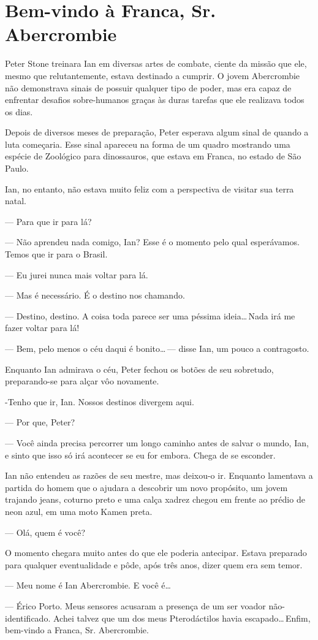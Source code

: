 \chapter{Bem-vindo à Franca, Sr. Abercrombie}

Peter Stone treinara Ian em diversas artes de combate, ciente da missão
que ele, mesmo que relutantemente, estava destinado a cumprir. O jovem
Abercrombie não demonstrava sinais de possuir qualquer tipo de poder,
mas era capaz de enfrentar desafios sobre-humanos graças às duras
tarefas que ele realizava todos os dias.

Depois de diversos meses de preparação, Peter esperava algum sinal de
quando a luta começaria. Esse sinal apareceu na forma de um quadro
mostrando uma espécie de Zoológico para dinossauros, que estava em
Franca, no estado de São Paulo.

Ian, no entanto, não estava muito feliz com a perspectiva de visitar sua
terra natal.

--- Para que ir para lá?

--- Não aprendeu nada comigo, Ian? Esse é o momento pelo qual
esperávamos. Temos que ir para o Brasil.

--- Eu jurei nunca mais voltar para lá.

--- Mas é necessário. É o destino nos chamando.

--- Destino, destino. A coisa toda parece ser uma péssima
ideia\ldots\,Nada irá me fazer voltar para lá!


--- Bem, pelo menos o céu daqui é bonito\ldots\,--- disse Ian, um pouco
a contragosto.

Enquanto Ian admirava o céu, Peter fechou os botões de seu sobretudo,
preparando-se para alçar vôo novamente.

-Tenho que ir, Ian. Nossos destinos divergem aqui.

--- Por que, Peter?

--- Você ainda precisa percorrer um longo caminho antes de salvar o
mundo, Ian, e sinto que isso só irá acontecer se eu for embora. Chega de
se esconder.

Ian não entendeu as razões de seu mestre, mas deixou-o ir. Enquanto
lamentava a partida do homem que o ajudara a descobrir um novo
propósito, um jovem trajando jeans, coturno preto e uma calça xadrez
chegou em frente ao prédio de neon azul, em uma moto Kamen preta.

--- Olá, quem é você?

O momento chegara muito antes do que ele poderia antecipar. Estava
preparado para qualquer eventualidade e pôde, após três anos, dizer quem
era sem temor.

--- Meu nome é Ian Abercrombie. E você é\ldots

--- Érico Porto. Meus sensores acusaram a presença de um ser voador
não-identificado. Achei talvez que um dos meus Pterodáctilos havia
escapado\ldots\,Enfim, bem-vindo a Franca, Sr. Abercrombie.
